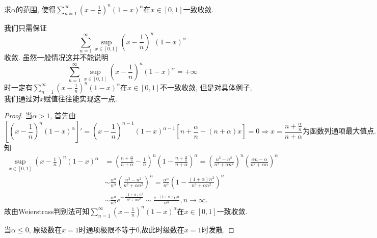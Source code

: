 \documentclass[../../main.tex]{subfiles}%
\begin{document}
\begin{example}
求$\alpha$的范围, 使得$\sum\limits_{n=1}^{\infty}\left(x-\frac{1}{n}\right)^n(1-x)^\alpha$在$x\in[0,1]$一致收敛.
\end{example}
\begin{note}
我们只需保证
$$
\sum_{n=1}^{\infty}\sup_{x\in[0,1]}\left(x-\frac{1}{n}\right)^n(1-x)^\alpha
$$
收敛. 虽然一般情况这并不能说明
$$
\sum_{n=1}^{\infty}\sup_{x\in[0,1]}\left(x-\frac{1}{n}\right)^n(1-x)^\alpha=+\infty
$$
时一定有$\sum\limits_{n=1}^{\infty}\left(x-\frac{1}{n}\right)^n(1-x)^\alpha$在$x\in[0,1]$不一致收敛, 但是对具体例子, 我们通过对$x$赋值往往能实现这一点.
\end{note}
\begin{proof}
当$\alpha>1$, 首先由
$$
\left[\left(x-\frac{1}{n}\right)^n(1-x)^\alpha\right]'=\left(x-\frac{1}{n}\right)^{n-1}(1-x)^{\alpha-1}\left[n+\frac{\alpha}{n}-(n+\alpha)x\right]=0\Rightarrow x=\frac{n+\frac{\alpha}{n}}{n+\alpha}\text{为函数列通项最大值点}.
$$
知
\begin{align*}
\mathop {\mathrm{sup}} \limits_{x\in [0,1]}\left( x-\frac{1}{n} \right) ^n(1-x)^{\alpha}&=\left( \frac{n+\frac{\alpha}{n}}{n+\alpha}-\frac{1}{n} \right) ^n\left( 1-\frac{n+\frac{\alpha}{n}}{n+\alpha} \right) ^{\alpha}=\left( \frac{n^3-n^2}{n^3+\alpha n^2} \right) ^n\left( \frac{\alpha n-\alpha}{n^2+\alpha n} \right) ^{\alpha}
\\
&\sim \frac{\alpha ^{\alpha}}{n^{\alpha}}\left( \frac{n^3-n^2}{n^3+\alpha n^2} \right) ^n=\frac{\alpha ^{\alpha}}{n^{\alpha}}\left( 1-\frac{\left( 1+\alpha \right) n^2}{n^3+\alpha n^2} \right) ^n
\\
&\sim \frac{\alpha ^{\alpha}}{n^{\alpha}}e^{-\frac{\left( 1+\alpha \right) n^3}{n^3+\alpha n^2}}\sim \frac{e^{-(1+\alpha)}\alpha ^{\alpha}}{n^{\alpha}},n\rightarrow \infty .
\end{align*}
故由Weierstrass判别法可知$\sum\limits_{n=1}^{\infty}\left(x-\frac{1}{n}\right)^n(1-x)^\alpha$在$x\in[0,1]$一致收敛.

当$\alpha\leqslant0$, 原级数在$x=1$时通项极限不等于0,故此时级数在$x=1$时发散.


\end{proof}
\end{document}
